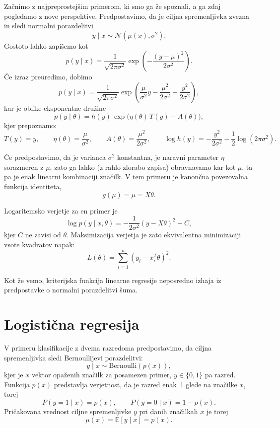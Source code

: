 Začnimo z najpreprostejšim primerom, ki smo ga že spoznali, a ga zdaj pogledamo z nove perspektive. Predpostavimo, da je ciljna spremenljivka zvezna in sledi normalni porazdelitvi
\[
y \mid x \sim \mathcal{N}(\mu(x), \sigma^2).
\]
Gostoto lahko zapišemo kot
\[
p(y \mid x) = \frac{1}{\sqrt{2\pi\sigma^2}} \exp\!\left(-\frac{(y - \mu)^2}{2\sigma^2}\right).
\]
Če izraz preuredimo, dobimo
\[
p(y \mid x) = \frac{1}{\sqrt{2\pi\sigma^2}} \exp\!\left(\frac{\mu}{\sigma^2} y - \frac{\mu^2}{2\sigma^2} - \frac{y^2}{2\sigma^2}\right),
\]
kar je oblike eksponentne družine
\[
p(y \mid \theta) = h(y)\,\exp\big(\eta(\theta)\,T(y) - A(\theta)\big),
\]
kjer prepoznamo:
\[
T(y) = y, \qquad \eta(\theta) = \frac{\mu}{\sigma^2}, \qquad A(\theta) = \frac{\mu^2}{2\sigma^2}, \qquad \log h(y) = -\frac{y^2}{2\sigma^2} - \frac{1}{2}\log(2\pi\sigma^2).
\]

Če predpostavimo, da je varianca $\sigma^2$ konstantna, je naravni parameter $\eta$ sorazmeren z $\mu$, zato ga lahko (z rahlo zlorabo zapisa) obravnavamo kar kot $\mu$, ta pa je enak linearni kombinaciji značilk. V tem primeru je kanončna povezovalna funkcija identiteta, 
\[
g(\mu) = \mu = X\theta.
\]

Logaritemsko verjetje za en primer je
\[
\log p(y \mid x, \theta) = -\frac{1}{2\sigma^2}(y - X\theta)^2 + C,
\]
kjer $C$ ne zavisi od $\theta$. Maksimizacija verjetja je zato ekvivalentna minimizaciji vsote kvadratov napak:
\[
L(\theta) = \sum_{i=1}^n (y_i - x_i^T \theta)^2.
\]

Kot že vemo, kriterijska funkcija linearne regresije neposredno izhaja iz predpostavke o normalni porazdelitvi šuma.

\section{Logistična regresija}

V primeru klasifikacije z dvema razredoma predpostavimo, da ciljna spremenljivka sledi Bernoullijevi porazdelitvi:
\[
y \mid x \sim \mathrm{Bernoulli}(p(x)),
\]
kjer je $x$ vektor opaženih značilk za posamezen primer, $y \in \{0,1\}$ pa razred. Funkcija $p(x)$ predstavlja verjetnost, da je razred enak~1 glede na značilke $x$, torej
\[
P(y=1 \mid x) = p(x), \qquad P(y=0 \mid x) = 1 - p(x).
\]
Pričakovana vrednost ciljne spremenljivke $y$ pri danih značilkah $x$ je torej
\[
\mu(x) = \mathbb{E}[y \mid x] = p(x).
\]

